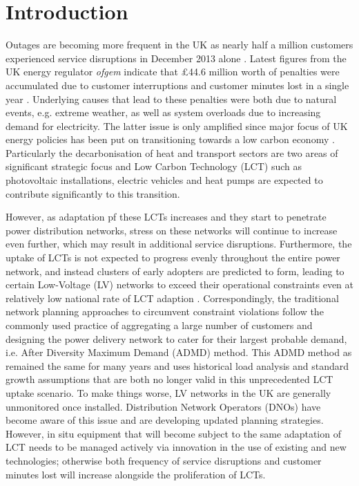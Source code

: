 \section{Introduction}
\label{ch2:sec:introduction}

Outages are becoming more frequent in the UK as nearly half a million customers experienced service disruptions in December 2013 alone \cite{Ofgem2014}.
Latest figures from the UK energy regulator \textit{ofgem} indicate that \pounds44.6 million worth of penalties were accumulated due to customer interruptions and customer minutes lost in a single year \cite{Ofgem2012}.
Underlying causes that lead to these penalties were both due to natural events, e.g. extreme weather, as well as system overloads due to increasing demand for electricity.
The latter issue is only amplified since major focus of UK energy policies has been put on transitioning towards a low carbon economy \cite{HMGovernment2009, RoyalAcademyofEngineering2010}.
Particularly the decarbonisation of heat and transport sectors are two areas of significant strategic focus and Low Carbon Technology (LCT) such as photovoltaic installations, electric vehicles and heat pumps are expected to contribute significantly to this transition.

However, as adaptation pf these LCTs increases and they start to penetrate power distribution networks, stress on these networks will continue to increase even further, which may result in additional service disruptions.
Furthermore, the uptake of LCTs is not expected to progress evenly throughout the entire power network, and instead clusters of early adopters are predicted to form, leading to certain Low-Voltage (LV) networks to exceed their operational constraints even at relatively low national rate of LCT adaption \cite{Poghosyan2014}.
Correspondingly, the traditional network planning approaches to circumvent constraint violations follow the commonly used practice of aggregating a large number of customers and designing the power delivery network to cater for their largest probable demand, i.e. After Diversity Maximum Demand (ADMD) method.
This ADMD method as remained the same for many years and uses historical load analysis and standard growth assumptions that are both no longer valid in this unprecedented LCT uptake scenario.
To make things worse, LV networks in the UK are generally unmonitored once installed.
Distribution Network Operators (DNOs) have become aware of this issue and are developing updated planning strategies.
However, in situ equipment that will become subject to the same adaptation of LCT needs to be managed actively via innovation in the use of existing and new technologies; otherwise both frequency of service disruptions and customer minutes lost will increase alongside the proliferation of LCTs.

